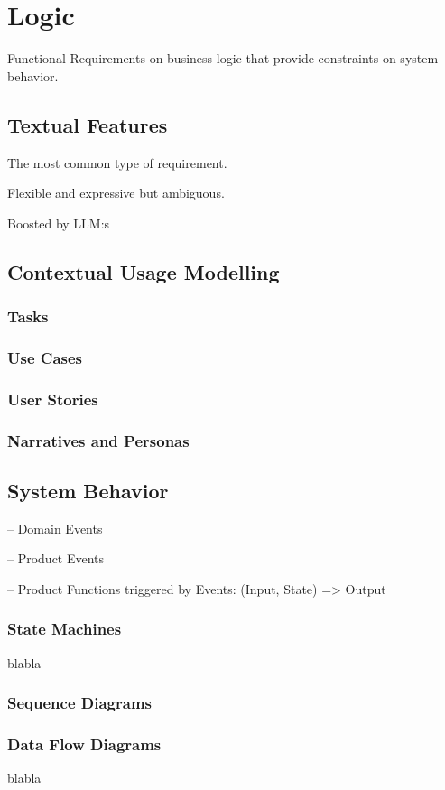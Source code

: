 
\chapter{Logic}%

Functional Requirements on business logic that provide constraints on system behavior.

\section{Textual Features}%

The most common type of requirement.

Flexible and expressive but ambiguous.

Boosted by LLM:s


\section{Contextual Usage Modelling}%

\subsection{Tasks}

\subsection{Use Cases}

\subsection{User Stories}

\subsection{Narratives and Personas}


\section{System Behavior}

-- Domain Events

-- Product Events

-- Product Functions triggered by Events: (Input, State) => Output

\subsection{State Machines}%
blabla 

\subsection{Sequence Diagrams}

\subsection{Data Flow Diagrams}%
blabla 


